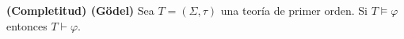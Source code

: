   \begin{theorem} \label{theorem_82}
    \PN \textbf{(Completitud) (G{\"o}del)} Sea $T = (\Sigma, \tau)$ una teoría de primer orden. Si $T \models \varphi$
    entonces $T \vdash \varphi$.
  \end{theorem}
